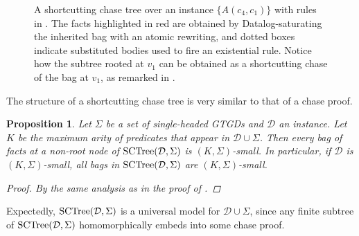 \documentclass[12pt]{report}
\theoremstyle{plain}
\newtheorem{proposition}[theorem]{Proposition}
\theoremstyle{definition}
\newcommand{\SCTree}[2]{\ensuremath{\normalfont{\textrm{SCTree}}\!\left( #1, #2 \right)}}
\begin{document}
\begin{figure}[t]
  \centering
  
  \caption{A shortcutting chase tree over an instance $\{ A(c_4, c_1) \}$ with rules in . The facts highlighted in red are obtained by Datalog-saturating the inherited bag with an atomic rewriting, and dotted boxes indicate substituted bodies used to fire an existential rule. Notice how the subtree rooted at $v_1$ can be obtained as a shortcutting chase of the bag at $v_1$, as remarked in .}
  \label{figure:sctree-simple-example}
\end{figure}

The structure of a shortcutting chase tree is very similar to that of a chase proof.

\begin{proposition}
\label{proposition:each-bag-in-sctree-is-k-sigma-small}
  Let $\Sigma$ be a set of single-headed GTGDs and $\mathcal{D}$ an instance. Let $K$ be the maximum arity of predicates that appear in $\mathcal{D} \cup \Sigma$. Then every bag of facts at a non-root node of \emph{$\SCTree{\mathcal{D}}{\Sigma}$} is $(K, \Sigma)$-small. In particular, if $\mathcal{D}$ is $(K, \Sigma)$-small, all bags in $\SCTree{\mathcal{D}}{\Sigma}$ are $(K, \Sigma)$-small.
  \begin{proof}
    By the same analysis as in the proof of .
  \end{proof}
\end{proposition}

Expectedly, $\SCTree{\mathcal{D}}{\Sigma}$ is a universal model for $\mathcal{D} \cup \Sigma$, since any finite subtree of $\SCTree{\mathcal{D}}{\Sigma}$ homomorphically embeds into some chase proof.
\end{document}
